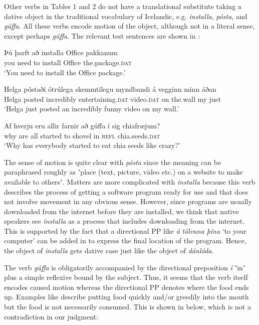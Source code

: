 \documentclass[output=paper,modfonts,nonflat,colorlinks,citecolor=brown]{langsci/langscibook}
\begin{document}
Other verbs in Tables 1 and 2 do not have a translational substitute taking a dative object in the traditional vocabulary of Icelandic, e.g. \textit{installa}, \textit{pósta}, and \textit{gúffa}. All these verbs encode motion of the object, although not in a literal sense, except perhaps \textit{gúffa}. The relevant test sentences are shown in : 


\ea%
    \label{ex:jonsson:3}
\ea\label{ex:jonsson:3a}
\gll   Þú   þarft   að   installa   Office   pakkanum\\
     you   need   to   install   Office   the.package.\textsc{dat}\\
\glt `You need to install the Office package.'
 
\ex\label{ex:jonsson:3b}
\gll   Helga  póstaði  ótrúlega  skemmtilegu  myndbandi  á  vegginn  minn  áðan\\
 Helga   posted   incredibly   entertaining.\textsc{dat}   video.\textsc{dat}   on   the.wall   my   just\\
\glt `Helga just posted an incredibly funny video on my wall.'
 

\ex\label{ex:jonsson:3c}
\gll   Af hverju  eru  allir  farnir  að  gúffa  í  sig  chiafræjum?\\
 why   are   all   started   to   shovel   in   \textsc{refl}   chia.seeds.\textsc{dat}\\
\glt `Why has everybody started to eat chia seeds like crazy?'
\z
\z

The sense of motion is quite clear with \textit{pósta} since the meaning can be paraphrased roughly as ʽplace (text, picture, video etc.) on a website to make available to othersʼ. Matters are more complicated with \textit{installa} because this verb describes the process of getting a software program ready for use and that does not involve movement in any obvious sense. However, since programs are usually downloaded from the internet before they are installed, we think that native speakers see \textit{installa} as a process that includes downloading from the internet. This is supported by the fact that a directional PP like \textit{á} \textit{tölvuna} \textit{þína} ‘to your computer’ can be added in  to express the final location of the program. Hence, the object of \textit{installa} gets dative case just like the object of \textit{dánlóda}. 

The verb \textit{gúffa} is obligatorily accompanied by the directional preposition \textit{í} ʽinʼ plus a simple reflexive bound by the subject. Thus, it seems that the verb itself encodes caused motion whereas the directional PP denotes where the food ends up. Examples like  describe putting food quickly and/or greedily into the mouth but the food is not necessarily consumed. This is shown in  below, which is not a contradiction in our judgment: 
\end{document}
